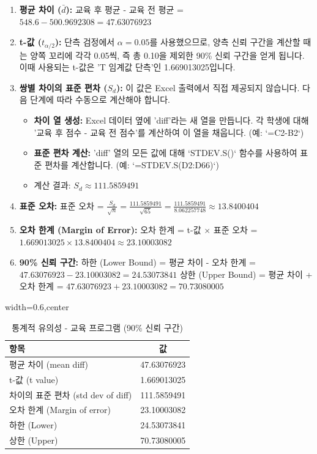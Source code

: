 \documentclass[11pt,a4paper]{article}
\begin{document}
\begin{enumerate}
    \item \textbf{평균 차이 ($\bar{d}$):}
    교육 후 평균 - 교육 전 평균 = $548.6 - 500.9692308 = 47.63076923$
    \item \textbf{t-값 ($t_{\alpha/2}$):}
    단측 검정에서 $\alpha = 0.05$를 사용했으므로, 양측 신뢰 구간을 계산할 때는 양쪽 꼬리에 각각 0.05씩, 즉 총 0.10을 제외한 90\% 신뢰 구간을 얻게 됩니다. 이때 사용되는 t-값은 'T 임계값 단측'인 1.669013025입니다.
    \item \textbf{쌍별 차이의 표준 편차 ($S_d$):}
    이 값은 Excel 출력에서 직접 제공되지 않습니다. 다음 단계에 따라 수동으로 계산해야 합니다.
    \begin{itemize}
        \item \textbf{차이 열 생성:} Excel 데이터 옆에 'diff'라는 새 열을 만듭니다. 각 학생에 대해 '교육 후 점수 - 교육 전 점수'를 계산하여 이 열을 채웁니다. (예: `=C2-B2`)
        \item \textbf{표준 편차 계산:} 'diff' 열의 모든 값에 대해 `STDEV.S()` 함수를 사용하여 표준 편차를 계산합니다. (예: `=STDEV.S(D2:D66)`)
        \item 계산 결과: $S_d \approx 111.5859491$
    \end{itemize}
    \item \textbf{표준 오차:}
    표준 오차 = $\frac{S_d}{\sqrt{n}} = \frac{111.5859491}{\sqrt{65}} = \frac{111.5859491}{8.062257748} \approx 13.8400404$
    \item \textbf{오차 한계 (Margin of Error):}
    오차 한계 = t-값 $\times$ 표준 오차 = $1.669013025 \times 13.8400404 \approx 23.10003082$
    \item \textbf{90\% 신뢰 구간:}
    하한 (Lower Bound) = 평균 차이 - 오차 한계 = $47.63076923 - 23.10003082 = 24.53073841$
    상한 (Upper Bound) = 평균 차이 + 오차 한계 = $47.63076923 + 23.10003082 = 70.73080005$
\end{enumerate}

\begin{table}[h!]
\caption{통계적 유의성 - 교육 프로그램 (90\% 신뢰 구간)}
\label{tab:training_ci}
\centering
\begin{adjustbox}{width=0.6\textwidth,center}
\begin{tabular}{lc}
\toprule
\textbf{항목} & \textbf{값} \\
\midrule
평균 차이 (mean diff) & 47.63076923 \\
t-값 (t value) & 1.669013025 \\
차이의 표준 편차 (std dev of diff) & 111.5859491 \\
오차 한계 (Margin of error) & 23.10003082 \\
하한 (Lower) & 24.53073841 \\
상한 (Upper) & 70.73080005 \\
\bottomrule
\end{tabular}
\end{adjustbox}
\end{table}
\end{document}
